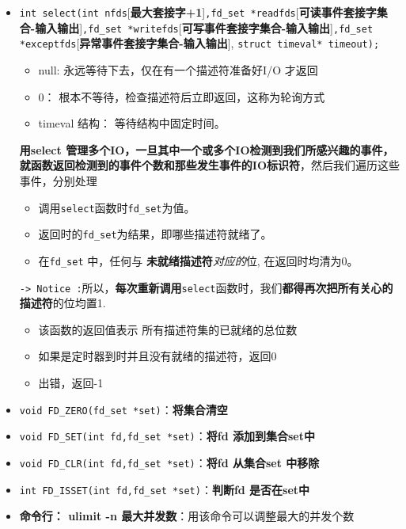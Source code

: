 \documentclass[UTF8,a4paper,12pt]{ctexbook}
\begin{document}
			\begin{itemize}
				\item \verb|int select(int nfds|[\textbf{最大套接字+1}]\verb|,fd_set *readfds|[\textbf{可读事件套接字集合-输入输出}]\verb|,fd_set *writefds|[\textbf{可写事件套接字集合-输入输出}]\verb|,fd_set *exceptfds|[\textbf{异常事件套接字集合-输入输出}], \verb|struct timeval* timeout);|
					
					\begin{itemize}
						\item null: 永远等待下去，仅在有一个描述符准备好I/O 才返回
						\item 0：	根本不等待，检查描述符后立即返回，这称为轮询方式
						\item timeval 结构： 等待结构中固定时间。
					\end{itemize}
					
				\textbf{用select 管理多个IO，一旦其中一个或多个IO检测到我们所感兴趣的事件，就函数返回检测到的事件个数和那些发生事件的IO标识符}，然后我们遍历这些事件，分别处理
				
					\begin{itemize}
						\item 调用\verb|select|函数时\verb|fd_set|为值。
						\item 返回时的\verb|fd_set|为结果，即哪些描述符就绪了。
						\item 在\verb|fd_set| 中，任何与 \textbf{未就绪描述符}\textit{对应的}位, 在返回时均清为0。
					\end{itemize}
					
				\verb|-> Notice :|所以，\textbf{每次重新调用}\verb|select|函数时，我们\textbf{都得再次把所有关心的描述符}的位均置1. 
				
					\begin{itemize}
						\item 该函数的返回值表示 所有描述符集的已就绪的总位数
						\item 如果是定时器到时并且没有就绪的描述符，返回0
						\item 出错，返回-1
					\end{itemize}
				\item \verb|void FD_ZERO(fd_set *set)|：\textbf{将集合清空}
				\item \verb|void FD_SET(int fd,fd_set *set)|：\textbf{将fd 添加到集合set中}
				\item \verb|void FD_CLR(int fd,fd_set *set)|：\textbf{将fd 从集合set 中移除}
				\item \verb|int FD_ISSET(int fd,fd_set *set)|：\textbf{判断fd 是否在set中}
				\item \textbf{命令行： ulimit -n 最大并发数}：用该命令可以调整最大的并发个数
			\end{itemize}
\end{document}
